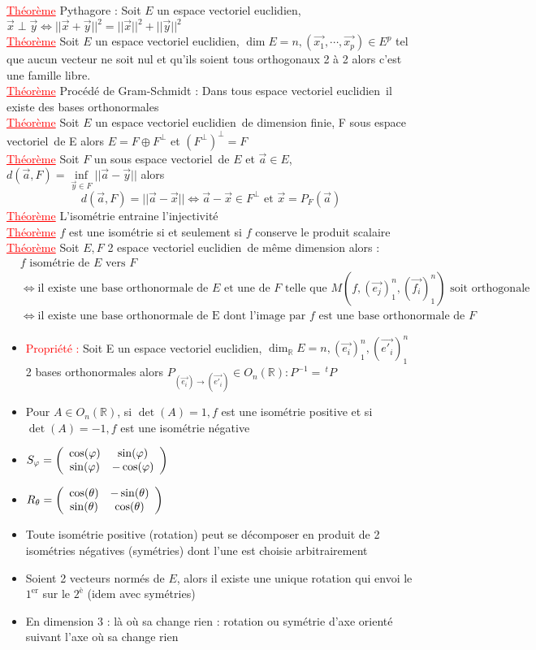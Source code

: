 \documentclass[a4paper, 11pt, french]{article}
\newcommand{\R}{\mathbb{R}}
\newcommand{\te}{\theta}
\newcommand{\ph}{\varphi}
\newcommand{\ev}{espace vectoriel}
\newcommand{\eve}{espace vectoriel euclidien}
\newcommand{\thm}{\textcolor{red}{\underline{Théorème} }}
\newcommand{\ppt}{\textcolor{red}{Propriété : }}
\begin{document}
	 \thm Pythagore : Soit $E$ un \eve, $\vec{x} \perp \vec{y} \iff {||\vec{x}+\vec{y}||^2=||\vec{x}||^2+||\vec{y}||^2}$ \\
	 \thm Soit $E$  un \eve, $\dim E=n, (\vec{x_1},\cdots,\vec{x_p}) \in E^p$ tel que aucun vecteur ne soit nul et qu'ils soient tous orthogonaux 2 à 2 alors c'est une famille libre. \\
	 \thm Procédé de Gram-Schmidt : Dans tous  \eve \, il existe des bases orthonormales \\
	 \thm Soit $E$ un \eve \, de dimension finie, F sous \ev\, de E alors $E=F\oplus F^{\perp}$ et $(F^{\perp})^{\perp}=F$ \\
	 \thm Soit $F$ un sous \ev \, de $E$ et $\vec{a} \in E$, $d(\vec{a},F)=\underset{\vec{y} \in F}\inf ||\vec{a}-\vec{y}||$ alors $$d(\vec{a},F)=||\vec{a}-\vec{x}|| \iff \vec{a}-\vec{x} \in F^{\perp} \text{ et }\vec{x}=P_F(\vec{a})$$
	 \thm L'isométrie entraine l'injectivité \\
	 \thm $f$ est une isométrie si et seulement si $f$ conserve le produit scalaire \\
	 \thm Soit $E,F$ 2 \eve \, de même dimension alors :
			\begin{align*}
				&f \text{ isométrie de $E$ vers $F$} \\
				&\iff \text{il existe une base orthonormale de $E$ et une de $F$ telle que $M(f,(\vec{e_j})_1^n,(\vec{f_i})_1^n)$ soit orthogonale} \\
				&\iff \text{il existe une base orthonormale de E$$ dont l'image par $f$ est une base orthonormale de $F$}
			\end{align*}
	\begin{itemize}
 		\item \ppt Soit E un \eve, $\dim_{\R}E=n, (\vec{e_i})_1^n,(\vec{e'_i})_1^n$ 2 bases orthonormales alors $P_{(\vec{e_i}) \rightarrow (\vec{e'_i})} \in O_n(\R) : P^{-1}=\,^tP$
 		\item Pour $A \in O_n(\R)$, si $\det(A)=1, f$ est une isométrie positive et si $\det(A)=-1,f$ est une isométrie négative
 		\item $S_\ph=\left( \begin{array}{c c} \cos(\ph) & \sin(\ph) \\ \sin(\ph) & -\cos(\ph) \end{array} \right)$
 		\item $R_\te=\left( \begin{array}{c c} \cos(\te) & -\sin(\te) \\ \sin(\te) & \cos(\te) \end{array} \right)$
 		\item Toute isométrie positive (rotation) peut se décomposer en produit de 2 isométries négatives (symétries) dont l'une est choisie arbitrairement
		\item Soient 2 vecteurs normés de $E$, alors il existe une unique rotation qui envoi le $1^{\text{er}}$ sur le $2^{\text{è}}$ (idem avec symétries)
		\item En dimension 3 : là où sa change rien : rotation ou symétrie d'axe orienté suivant l'axe où sa change rien
	\end{itemize}
\end{document}
